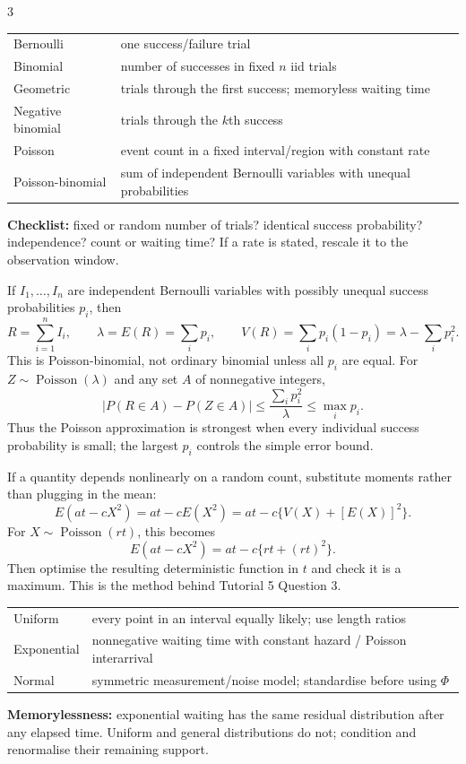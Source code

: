 \documentclass[10pt]{article}
\newcommand{\boxstart}[1]{\begin{tcolorbox}[title={#1},sharp corners]}
\newcommand{\boxend}{\end{tcolorbox}}
\begin{document}
\begin{multicols*}{3}
	\boxstart{L5 — Choosing a discrete model}
	\begin{tabularx}{\linewidth}{@{}lX@{}}
		Bernoulli         & one success/failure trial                                         \\
		Binomial          & number of successes in fixed $n$ iid trials                       \\
		Geometric         & trials through the first success; memoryless waiting time         \\
		Negative binomial & trials through the $k$th success                                  \\
		Poisson           & event count in a fixed interval/region with constant rate         \\
		Poisson-binomial  & sum of independent Bernoulli variables with unequal probabilities \\
	\end{tabularx}
	\smallskip
	\textbf{Checklist:} fixed or random number of trials? identical success probability? independence? count or waiting time? If a rate is stated, rescale it to the observation window.
	\boxend

	\boxstart{L5 — Poisson-binomial distribution}
	If $I_1,\ldots,I_n$ are independent Bernoulli variables with possibly unequal success probabilities $p_i$, then
	\[
		R=\sum_{i=1}^n I_i,\qquad
		\lambda=E(R)=\sum_i p_i,
		\qquad
		V(R)=\sum_i p_i(1-p_i)=\lambda-\sum_i p_i^2.
	\]
	This is Poisson-binomial, not ordinary binomial unless all $p_i$ are equal. For $Z\sim\operatorname{Poisson}(\lambda)$ and any set $A$ of nonnegative integers,
	\[
		\left|P(R\in A)-P(Z\in A)\right|
		\le \frac{\sum_i p_i^2}{\lambda}
		\le \max_i p_i.
	\]
	Thus the Poisson approximation is strongest when every individual success probability is small; the largest $p_i$ controls the simple error bound.
	\boxend

	\boxstart{L5 — Nonlinear expected-value template}
	If a quantity depends nonlinearly on a random count, substitute moments rather than plugging in the mean:
	\[
		E(a t-cX^2)=a t-cE(X^2)
		=a t-c\{V(X)+[E(X)]^2\}.
	\]
	For $X\sim\operatorname{Poisson}(rt)$, this becomes
	\[
		E(a t-cX^2)=a t-c\{rt+(rt)^2\}.
	\]
	Then optimise the resulting deterministic function in $t$ and check it is a maximum. This is the method behind Tutorial 5 Question 3.
	\boxend

	\boxstart{L6 — Choosing a continuous model}
	\begin{tabularx}{\linewidth}{@{}lX@{}}
		Uniform     & every point in an interval equally likely; use length ratios         \\
		Exponential & nonnegative waiting time with constant hazard / Poisson interarrival \\
		Normal      & symmetric measurement/noise model; standardise before using $\Phi$   \\
	\end{tabularx}
	\smallskip
	\textbf{Memorylessness:} exponential waiting has the same residual distribution after any elapsed time. Uniform and general distributions do not; condition and renormalise their remaining support.
	\boxend


\end{multicols*}
\end{document}
